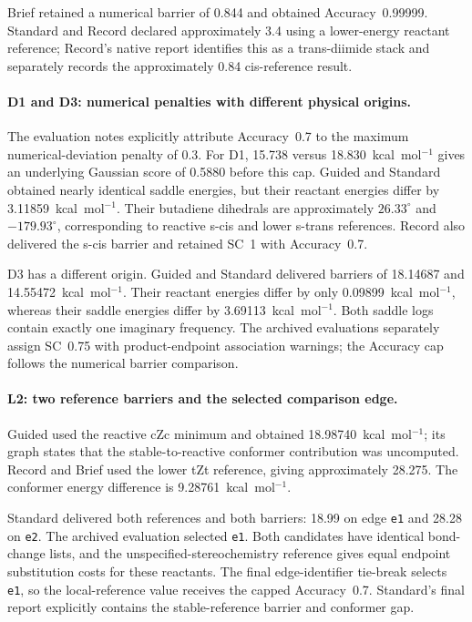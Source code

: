 Brief retained a numerical barrier of 0.844 and obtained Accuracy~0.99999. Standard and Record declared approximately 3.4 using a lower-energy reactant reference; Record's native report identifies this as a trans-diimide stack and separately records the approximately 0.84 cis-reference result.

\paragraph{D1 and D3: numerical penalties with different physical origins.}
The evaluation notes explicitly attribute Accuracy~0.7 to the maximum numerical-deviation penalty of 0.3. For D1, 15.738 versus 18.830~kcal~mol$^{-1}$ gives an underlying Gaussian score of 0.5880 before this cap. Guided and Standard obtained nearly identical saddle energies, but their reactant energies differ by 3.11859~kcal~mol$^{-1}$. Their butadiene dihedrals are approximately $26.33^\circ$ and $-179.93^\circ$, corresponding to reactive s-cis and lower s-trans references. Record also delivered the s-cis barrier and retained SC~1 with Accuracy~0.7.

D3 has a different origin. Guided and Standard delivered barriers of 18.14687 and 14.55472~kcal~mol$^{-1}$. Their reactant energies differ by only 0.09899~kcal~mol$^{-1}$, whereas their saddle energies differ by 3.69113~kcal~mol$^{-1}$. Both saddle logs contain exactly one imaginary frequency. The archived evaluations separately assign SC~0.75 with product-endpoint association warnings; the Accuracy cap follows the numerical barrier comparison.

\paragraph{L2: two reference barriers and the selected comparison edge.}
Guided used the reactive cZc minimum and obtained 18.98740~kcal~mol$^{-1}$; its graph states that the stable-to-reactive conformer contribution was uncomputed. Record and Brief used the lower tZt reference, giving approximately 28.275. The conformer energy difference is 9.28761~kcal~mol$^{-1}$.

Standard delivered both references and both barriers: 18.99 on edge \texttt{e1} and 28.28 on \texttt{e2}. The archived evaluation selected \texttt{e1}. Both candidates have identical bond-change lists, and the unspecified-stereochemistry reference gives equal endpoint substitution costs for these reactants. The final edge-identifier tie-break selects \texttt{e1}, so the local-reference value receives the capped Accuracy~0.7. Standard's final report explicitly contains the stable-reference barrier and conformer gap.

